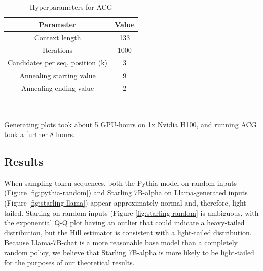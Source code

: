 \documentclass{article}
\begin{document}
\begin{table}
    \centering
    \label{tableh}
    \begin{tabular}{|c|c|}
        \hline
        Parameter & Value \\
        \hline
        Context length & 133 \\
        \hline
        Iterations & 1000 \\
        \hline
        Candidates per seq. position (k) & 3 \\
        \hline
        Annealing starting value & 9 \\
        \hline
        Annealing ending value & 2 \\
        \hline
    \end{tabular} \\
    \caption{Hyperparameters for ACG}
\end{table}

Generating plots took about 5 GPU-hours on 1x Nvidia H100, and running ACG took a further 8 hours.

\subsection{Results\label{sec:experiments}}

When sampling token sequences, both the Pythia model on random inputs (Figure \ref{fig:pythia-random}) and Starling 7B-alpha on Llama-generated inputs (Figure \ref{fig:starling-llama}) appear approximately normal and, therefore, light-tailed. Starling on random inputs (Figure \ref{fig:starling-random} is ambiguous, with the exponential Q-Q plot having an outlier that could indicate a heavy-tailed distribution, but the Hill estimator is consistent with a light-tailed distribution. Because Llama-7B-chat is a more reasonable base model than a completely random policy, we believe that Starling 7B-alpha is more likely to be light-tailed for the purposes of our theoretical results.
\end{document}
